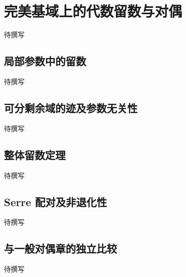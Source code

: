 
% 
% 

\section{完美基域上的代数留数与对偶}
\label{g5:sec:2303}

待撰写

\subsection{局部参数中的留数}
\label{g5:subsec:2303:01}
待撰写

\subsection{可分剩余域的迹及参数无关性}
\label{g5:subsec:2303:02}
待撰写

\subsection{整体留数定理}
\label{g5:subsec:2303:03}
待撰写

\subsection{Serre 配对及非退化性}
\label{g5:subsec:2303:04}
待撰写

\subsection{与一般对偶章的独立比较}
\label{g5:subsec:2303:05}
待撰写
